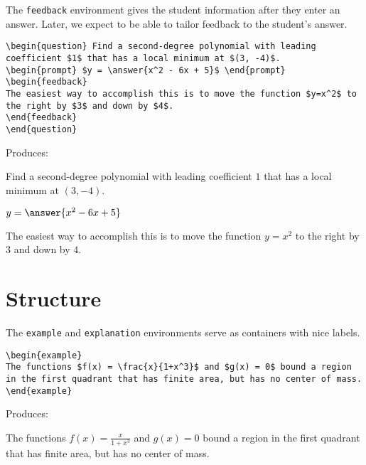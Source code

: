 \documentclass{ximera}
\begin{document}
\begin{example} The \verb!feedback! environment gives the student information after they enter an answer. Later, we expect to be able to tailor feedback to the student's answer.

\begin{verbatim}
\begin{question} Find a second-degree polynomial with leading coefficient $1$ that has a local minimum at $(3, -4)$.
\begin{prompt} $y = \answer{x^2 - 6x + 5}$ \end{prompt}
\begin{feedback}
The easiest way to accomplish this is to move the function $y=x^2$ to the right by $3$ and down by $4$.
\end{feedback}
\end{question}
\end{verbatim}

Produces:

\begin{question} Find a second-degree polynomial with leading coefficient $1$ that has a local minimum at $(3, -4)$.
\begin{prompt} $y = \answer{x^2 - 6x + 5}$ \end{prompt}
\begin{feedback}
The easiest way to accomplish this is to move the function $y=x^2$ to the right by $3$ and down by $4$.
\end{feedback}
\end{question}

\end{example}

\section{Structure} \label{StructuralEnvironments}

\begin{example}
The \verb!example! and \verb!explanation! environments serve as containers with nice labels. 

\begin{verbatim}
\begin{example}
The functions $f(x) = \frac{x}{1+x^3}$ and $g(x) = 0$ bound a region in the first quadrant that has finite area, but has no center of mass. 
\end{example}
\end{verbatim}

Produces:
\begin{example}
The functions $f(x) = \frac{x}{1+x^3}$ and $g(x) = 0$ bound a region in the first quadrant that has finite area, but has no center of mass. 
\end{example}
\end{example}
\end{document}

